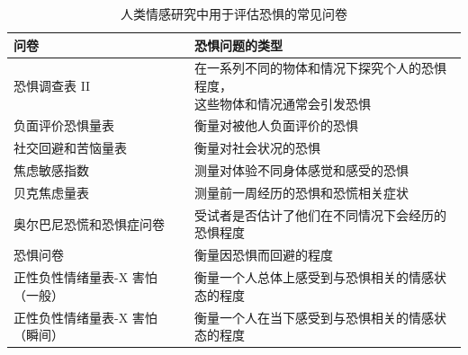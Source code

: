 \begin{table}[htbp]
	\caption{人类情感研究中用于评估恐惧的常见问卷} \label{tab:42_1} \centering
	\begin{tabular}{ll}
		\toprule
		问卷 & 恐惧问题的类型 \\
		\midrule
		恐惧调查表 II & \makecell{在一系列不同的物体和情况下探究个人的恐惧程度，\\这些物体和情况通常会引发恐惧} \\
		负面评价恐惧量表 & 衡量对被他人负面评价的恐惧 \\
		社交回避和苦恼量表 & 衡量对社会状况的恐惧 \\
		焦虑敏感指数 & 测量对体验不同身体感觉和感受的恐惧 \\
		贝克焦虑量表 & 测量前一周经历的恐惧和恐慌相关症状 \\
		奥尔巴尼恐慌和恐惧症问卷 & 受试者是否估计了他们在不同情况下会经历的恐惧程度 \\
		恐惧问卷 & 衡量因恐惧而回避的程度 \\
		正性负性情绪量表-X 害怕（一般） & 衡量一个人总体上感受到与恐惧相关的情感状态的程度 \\
		正性负性情绪量表-X 害怕（瞬间） & 衡量一个人在当下感受到与恐惧相关的情感状态的程度 \\
		\bottomrule
	\end{tabular}
\end{table}


